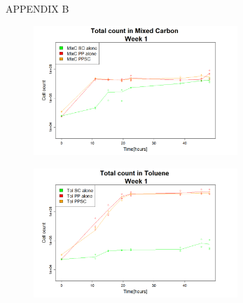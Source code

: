 \documentclass[a4paper, 10pt, conference]{ieeeconf}   %
\begin{document}
\begin{landscape}
	
	
	\begin{figure}
		APPENDIX B
		
		\flushleft
		\begin{subfigure}{.47\textheight}
			\centering
			
			\includegraphics[width=7.71cm]{totcount_mixC1.png}
			\caption{}
			
			\label{totcountmixC1}
		\end{subfigure}%
		\begin{subfigure}{.47\textheight}
			\centering
			
			\includegraphics[width=7.71cm]{totcount_tol1.png}
			\caption{}
			\label{totcounttol1}
		\end{subfigure}%
		\begin{subfigure}{.47\textheight}
			\centering
			

\end{subfigure}
\end{figure}
\end{landscape}
\end{document}
